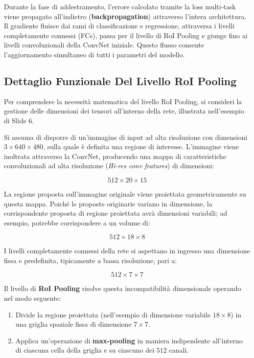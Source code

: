 ﻿\documentclass[11pt, a4paper]{article}
\begin{document}

Durante la fase di addestramento, l'errore calcolato tramite la loss multi-task viene propagato all'indietro (\textbf{backpropagation}) attraverso l'intera architettura. Il gradiente fluisce dai rami di classificazione e regressione, attraversa i livelli completamente connessi (FCs), passa per il livello di RoI Pooling e giunge fino ai livelli convoluzionali della ConvNet iniziale. Questo flusso consente l'aggiornamento simultaneo di tutti i parametri del modello.


\newpage

\subsection{Dettaglio Funzionale Del Livello RoI Pooling}

Per comprendere la necessità matematica del livello RoI Pooling, si consideri la gestione delle dimensioni dei tensori all'interno della rete, illustrata nell'esempio di Slide 6.

Si assuma di disporre di un'immagine di input ad alta risoluzione con dimensioni $3 \times 640 \times 480$, sulla quale è definita una regione di interesse. L'immagine viene inoltrata attraverso la ConvNet, producendo una mappa di caratteristiche convoluzionali ad alta risoluzione (\emph{Hi-res conv features}) di dimensioni:

\[
512 \times 20 \times 15
\]

La regione proposta sull'immagine originale viene proiettata geometricamente su questa mappa. Poiché le proposte originarie variano in dimensione, la corrispondente proposta di regione proiettata avrà dimensioni variabili; ad esempio, potrebbe corrispondere a un volume di:

\[
512 \times 18 \times 8
\]

I livelli completamente connessi della rete si aspettano in ingresso una dimensione fissa e predefinita, tipicamente a bassa risoluzione, pari a:

\[
512 \times 7 \times 7
\]

Il livello di \textbf{RoI Pooling} risolve questa incompatibilità dimensionale operando nel modo seguente:
\begin{enumerate}
    \item Divide la regione proiettata (nell'esempio di dimensione variabile $18 \times 8$) in una griglia spaziale fissa di dimensione $7 \times 7$.
    \item Applica un'operazione di \textbf{max-pooling} in maniera indipendente all'interno di ciascuna cella della griglia e su ciascuno dei $512$ canali.
\end{enumerate}
\end{document}
